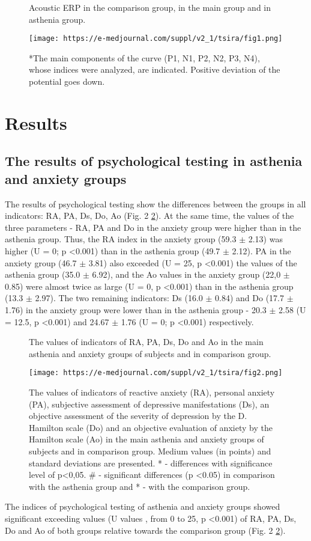 \documentclass[twocolumn]{article}
\begin{document}
\begin{figure}
\caption{Acoustic ERP in the comparison group, in the main group and in asthenia group.}
\label{fig1}
\texttt{[image: https://e-medjournal.com/suppl/v2\_1/tsira/fig1.png]}
\caption*{*The main components of the curve (P1, N1, P2, N2, P3, N4), whose indices were analyzed, are indicated. Positive deviation of the potential goes down.}
\end{figure}
\section {Results}
\subsection {The results of psychological testing in asthenia and anxiety groups}
\par The results of psychological testing show the differences between the groups in all indicators: RA, PA, Ds, Do, Ao (Fig. 2 \ref{fig2}). At the same time, the values of the three parameters - RA, PA and Do in the anxiety group were higher than in the asthenia group. Thus, the RA index in the anxiety group (59.3 $\pm$ 2.13) was higher (U \cite{bib15} = 0; p \textless{}0.001) than in the asthenia group (49.7 $\pm$ 2.12). PA in the anxiety group (46.7 $\pm$ 3.81) also exceeded (U = 25, p \textless{}0.001) the values of the asthenia group (35.0 $\pm$ 6.92), and the Ao values in the anxiety group (22,0 $\pm$ 0.85) were almost twice as large (U = 0, p \textless{}0.001) than in the asthenia group (13.3 $\pm$ 2.97). The two remaining indicators: Ds (16.0 $\pm$ 0.84) and Do (17.7 $\pm$ 1.76) in the anxiety group were lower than in the asthenia group - 20.3 $\pm$ 2.58 (U = 12.5, p \textless{}0.001) and 24.67 $\pm$ 1.76 (U = 0; p \textless{}0.001) respectively. 
\begin{figure}
\caption{The values of indicators of RA, PA, Ds, Do and Ao in the main asthenia and anxiety groups of subjects and in comparison group.}
\label{fig2}
\texttt{[image: https://e-medjournal.com/suppl/v2\_1/tsira/fig2.png]}
\caption*{The values of indicators of reactive anxiety (RA), personal anxiety (PA), subjective assessment of depressive manifestations (Ds), an objective assessment of the severity of depression by the D. Hamilton scale (Do) and an objective evaluation of anxiety by the Hamilton scale (Ao) in the main asthenia and anxiety groups of subjects and in comparison group. Medium values (in points) and standard deviations are presented. * - differences with significance level of p\textless{}0,05. \# - significant differences (p \textless{}0.05) in comparison with the asthenia group and * - with the comparison group.}
\end{figure}
\par 	The indices of psychological testing of asthenia and anxiety groups showed significant exceeding values (U values \cite{bib15}, \cite{bib20} from 0 to 25, p \textless{}0.001) of RA, PA, Ds, Do and Ao of both groups relative towards the comparison group (Fig. 2 \ref{fig2}).
\end{document}

